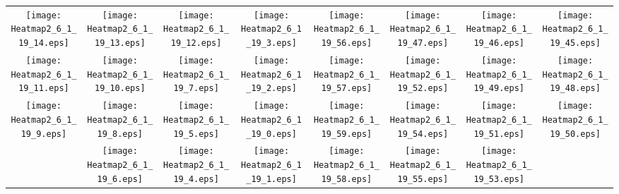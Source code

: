 \documentclass{standalone}
\begin{document}
\begin{tabular}{ *8{c} }
\texttt{[image: Heatmap2\_6\_1\_19\_14.eps]} & \texttt{[image: Heatmap2\_6\_1\_19\_13.eps]} & \texttt{[image: Heatmap2\_6\_1\_19\_12.eps]} & \texttt{[image: Heatmap2\_6\_1\_19\_3.eps]} & \texttt{[image: Heatmap2\_6\_1\_19\_56.eps]} & \texttt{[image: Heatmap2\_6\_1\_19\_47.eps]} & \texttt{[image: Heatmap2\_6\_1\_19\_46.eps]} & \texttt{[image: Heatmap2\_6\_1\_19\_45.eps]} \\
\texttt{[image: Heatmap2\_6\_1\_19\_11.eps]} & \texttt{[image: Heatmap2\_6\_1\_19\_10.eps]} & \texttt{[image: Heatmap2\_6\_1\_19\_7.eps]} & \texttt{[image: Heatmap2\_6\_1\_19\_2.eps]} & \texttt{[image: Heatmap2\_6\_1\_19\_57.eps]} & \texttt{[image: Heatmap2\_6\_1\_19\_52.eps]} & \texttt{[image: Heatmap2\_6\_1\_19\_49.eps]} & \texttt{[image: Heatmap2\_6\_1\_19\_48.eps]} \\
\texttt{[image: Heatmap2\_6\_1\_19\_9.eps]} & \texttt{[image: Heatmap2\_6\_1\_19\_8.eps]} & \texttt{[image: Heatmap2\_6\_1\_19\_5.eps]} & \texttt{[image: Heatmap2\_6\_1\_19\_0.eps]} & \texttt{[image: Heatmap2\_6\_1\_19\_59.eps]} & \texttt{[image: Heatmap2\_6\_1\_19\_54.eps]} & \texttt{[image: Heatmap2\_6\_1\_19\_51.eps]} & \texttt{[image: Heatmap2\_6\_1\_19\_50.eps]} \\
 & \texttt{[image: Heatmap2\_6\_1\_19\_6.eps]} & \texttt{[image: Heatmap2\_6\_1\_19\_4.eps]} & \texttt{[image: Heatmap2\_6\_1\_19\_1.eps]} & \texttt{[image: Heatmap2\_6\_1\_19\_58.eps]} & \texttt{[image: Heatmap2\_6\_1\_19\_55.eps]} & \texttt{[image: Heatmap2\_6\_1\_19\_53.eps]} &  
\end{tabular}
\end{document}
